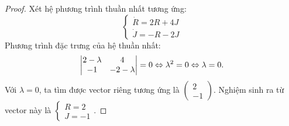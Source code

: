 \documentclass[a4paper]{article}
\begin{document}
\begin{proof}
    Xét hệ phương trình thuần nhất tương ứng: 
    $$\begin{cases}
    \dot{R}= 2R + 4J\\
    \dot{J}=-R - 2J
    \end{cases}$$
    Phương trình đặc trưng của hệ thuần nhất: 
    $$\begin{vmatrix}
2 - \lambda & 4 \\
-1 &  -2 - \lambda
\end{vmatrix} = 0 \Leftrightarrow \lambda^{2}  = 0 \Leftrightarrow \lambda = 0.\\$$
Với $\lambda = 0$, ta tìm được vector riêng tương ứng là $\begin{pmatrix}
    2 \\
    -1
\end{pmatrix}$. Nghiệm sinh ra từ vector này là $\begin{cases}
    R = 2\\
    J = -1
\end{cases}$. 


\end{proof}
\end{document}
